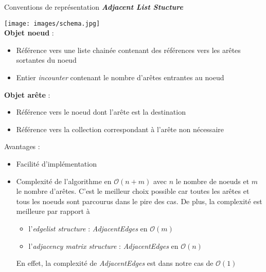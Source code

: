 \begin{frame}[allowframebreaks]{Conventions de représentation}
\textbf{\textit{Adjacent List Stucture}}\\
\begin{multicols}{2}
\texttt{[image: images/schema.jpg]}\\
\textbf{Objet noeud} : \begin{itemize}
\item Référence vers une liste chainée contenant des références vers les arêtes sortantes du noeud
\item Entier \textit{incounter} contenant le nombre d'arêtes entrantes au noeud\\
\end{itemize}

\textbf{Objet arête} : \begin{itemize}
\item Référence vers le noeud dont l'arête est la destination
\item Référence vers la collection correspondant à l'arête non nécessaire
\end{itemize}
\end{multicols}

\newpage
Avantages : \\
\begin{itemize}
\item Facilité d'implémentation
\item Complexité de l'algorithme en $\mathcal{O}(n+m)$ avec $n$ le nombre de noeuds et $m$ le nombre d'arêtes. C'est le meilleur choix possible car toutes les arêtes et tous les noeuds sont parcourus dans le pire des cas. De plus, la complexité est meilleure par rapport à
\begin{itemize}
\item l'\textit{edgelist structure} : \textit{AdjacentEdges} en $\mathcal{O}(m)$
\item l'\textit{adjacency matrix structure} : \textit{AdjacentEdges} en $\mathcal{O}(n)$
\end{itemize}
En effet, la complexité de \textit{AdjacentEdges} est dans notre cas de $\mathcal{O}(1)$
\end{itemize}
\end{frame}
